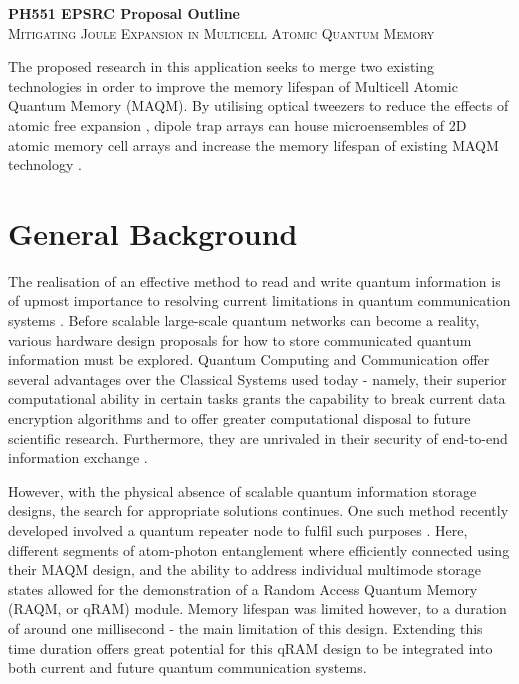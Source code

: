\documentclass[journal, a4paper]{IEEEtran}
\begin{document}
\onecolumn
\setcounter{page}{1}

\begin{center}
\huge{\bfseries PH551 EPSRC Proposal Outline} \\
\textsc{\Large Mitigating Joule Expansion in Multicell Atomic Quantum Memory} 
\end{center}

{
\large 

\noindent\makebox[\linewidth]{\rule{\textwidth}{0.4pt}}


\vspace{0.3cm}

\small{The proposed research in this application seeks to merge two existing technologies in order to improve the memory lifespan of Multicell Atomic Quantum Memory (MAQM). By utilising optical tweezers to reduce the effects of atomic free expansion \cite{OptTweezer}, dipole trap arrays can house microensembles of 2D atomic memory cell arrays and increase the memory lifespan of existing MAQM technology \cite{MainMAQM}.}


\section{General Background}

\vspace{0.2cm}

The realisation of an effective method to read and write quantum information is of upmost importance to resolving current limitations in quantum communication systems \cite{qRAMwalk}. Before scalable large-scale quantum networks can become a reality, various hardware design proposals for how to store communicated quantum information must be explored. Quantum Computing and Communication offer several advantages over the Classical Systems used today - namely, their superior computational ability in certain tasks grants the capability to break current data encryption algorithms \cite{postQcrypto} and to offer greater computational disposal to future scientific research. Furthermore, they are unrivaled in their security of end-to-end information exchange \cite{PubKeyQcrypto}. 

However, with the physical absence of scalable quantum information storage designs, the search for appropriate solutions continues. One such method recently developed involved a quantum repeater node to fulfil such purposes \cite{MainMAQM}. Here, different segments of atom-photon entanglement where efficiently connected using their MAQM design, and the ability to address individual multimode storage states allowed for the demonstration of a Random Access Quantum Memory (RAQM, or qRAM) module. Memory lifespan was limited however, to a duration of around one millisecond - the main limitation of this design. Extending this time duration offers great potential for this qRAM design to be integrated into both current and future quantum communication systems.  

}
\end{document}
